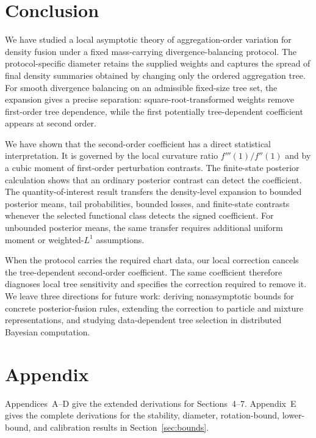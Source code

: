 \documentclass[11pt]{article}
\theoremstyle{plain}
\theoremstyle{definition}
\theoremstyle{definition}
\begin{document}
\section{Conclusion}\label{sec:conclusion}
We have studied a local asymptotic theory of aggregation-order variation for density fusion under a fixed mass-carrying divergence-balancing protocol. The protocol-specific diameter retains the supplied weights and captures the spread of final density summaries obtained by changing only the ordered aggregation tree. For smooth divergence balancing on an admissible fixed-size tree set, the expansion gives a precise separation: square-root-transformed weights remove first-order tree dependence, while the first potentially tree-dependent coefficient appears at second order.

We have shown that the second-order coefficient has a direct statistical interpretation. It is governed by the local curvature ratio $f'''(1)/f''(1)$ and by a cubic moment of first-order perturbation contrasts. The finite-state posterior calculation shows that an ordinary posterior contrast can detect the coefficient. The quantity-of-interest result transfers the density-level expansion to bounded posterior means, tail probabilities, bounded losses, and finite-state contrasts whenever the selected functional class detects the signed coefficient. For unbounded posterior means, the same transfer requires additional uniform moment or weighted-$L^1$ assumptions.

When the protocol carries the required chart data, our local correction cancels the tree-dependent second-order coefficient. The same coefficient therefore diagnoses local tree sensitivity and specifies the correction required to remove it. We leave three directions for future work: deriving nonasymptotic bounds for concrete posterior-fusion rules, extending the correction to particle and mixture representations, and studying data-dependent tree selection in distributed Bayesian computation.


\vspace{1cm}




\newpage
\appendix
\section*{Appendix}

Appendices~A--D give the extended derivations for Sections~4--7. Appendix~E gives the complete derivations for the stability, diameter, rotation-bound, lower-bound, and calibration results in Section~\ref{sec:bounds}.
\end{document}
